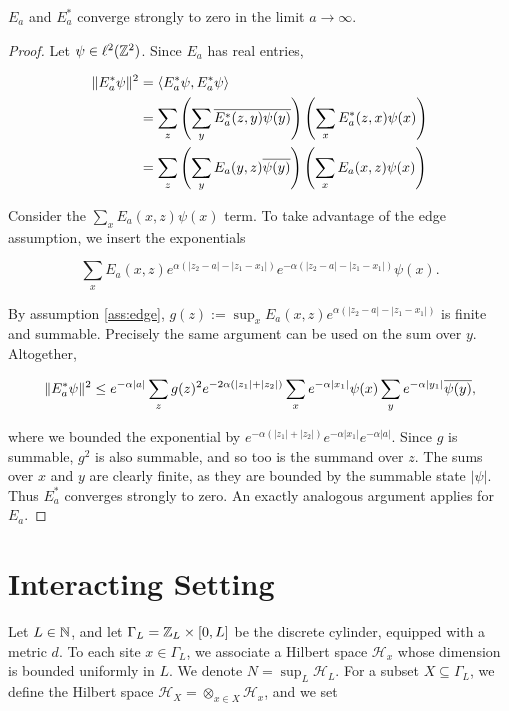 \documentclass[12pt, letterpaper]{article}
\begin{document}
\begin{lemma}
$E_a$ and $E_a^*$ converge strongly to zero in the limit $a\to\infty$.
\label{lemma:edge}
\end{lemma}
\begin{proof}
Let $\psi \in \ell^2(\mathbb{Z}^2)$. Since $E_a$ has real entries,

\[\begin{aligned}
\lVert E_a^* \psi \rVert^2 &= \langle E_a^*\psi, E_a^* \psi \rangle\\
&=\sum_z \left(\sum_y \overline{E_a^*(z,y)\psi(y)}\right) \left(\sum_x E_a^*(z,x)\psi(x)\right)\\
&=\sum_{z} \left(\sum_y E_a(y,z)\overline{\psi(y)}\right) \left(\sum_x E_a(x,z)\psi(x)\right)\\
\end{aligned}\]

Consider the $\sum_x E_a(x,z)\psi(x)$ term. To take advantage of the edge assumption, we insert the exponentials

\[\sum_x E_a(x,z)e^{\alpha (|z_2-a|-|z_1-x_1|)} e^{-\alpha (|z_2-a|-|z_1-x_1|)}\psi(x).\]

By assumption \ref{ass:edge}, $g(z) := \sup_x E_a(x,z)e^{\alpha (|z_2-a|-|z_1-x_1|)}$ is finite and summable. Precisely the same argument can be used on the sum over $y$. Altogether,


\[\lVert E_a^* \psi \rVert^2 \leq e^{-\alpha|a|}\sum_z g(z)^2 e^{-2\alpha (|z_1|+|z_2|)} \sum_x e^{-\alpha |x_1|}\psi(x)\sum_y e^{-\alpha |y_1|}\overline{\psi(y)},\]

where we bounded the exponential by $e^{-\alpha (|z_1|+|z_2|)}e^{-\alpha |x_1|}e^{-\alpha|a|}$. Since $g$ is summable, $g^2$ is also summable, and so too is the summand over $z$. The sums over $x$ and $y$ are clearly finite, as they are bounded by the summable state $|\psi|$. Thus $E_a^*$ converges strongly to zero. An exactly analogous argument applies for $E_a$.

\end{proof}

\section{Interacting Setting}

Let $L\in\mathbb{N}$, and let $\Gamma_L = \mathbb{Z}_L \times [0,L]$ be the discrete cylinder, equipped with a metric $d$. To each site $x \in \Gamma_L$, we associate a Hilbert space $\mathcal{H}_x$ whose dimension is bounded uniformly in $L$. We denote $N = \sup_L{\mathcal{H}_L}$. For a subset $X \subseteq \Gamma_L$, we define the Hilbert space $\mathcal{H}_X = \otimes_{x \in X} \mathcal{H}_x$, and we set 
\end{document}
